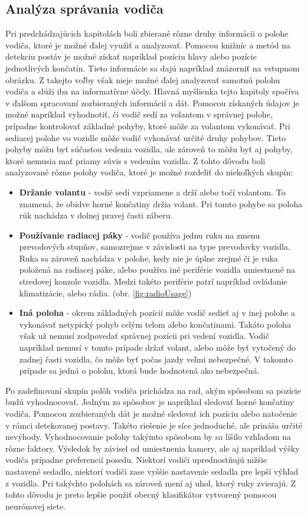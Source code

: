 \documentclass[slovak,master,dept460,male,cpp,cpdeclaration]{diploma}
\begin{document}
\newpage
\subsection{Analýza správania vodiča}
\label{sec:neuralNetwork}
Pri predchádzajúcich kapitolách boli zbierané rôzne druhy informácii o polohe vodiča, ktoré je možné ďalej využiť  a analyzovať. Pomocou   knižníc  a metód na detekciu postáv  je možné získať napríklad  pozíciu hlavy alebo pozície jednotlivých končatín.  Tieto informácie sa dajú napríklad znázorniť na vstupnom obrázku. Z takejto voľby však  nieje možné ďalej analyzovať samotnú polohu vodiča a slúži iba na informatívne účely. Hlavná myšlienka tejto kapitoly spočíva v ďalšom spracovaní zozbieraných informácií a dát. Pomocou získaných údajov je možné napríklad vyhodnotiť, či vodič sedí za volantom v správnej polohe, prípadne kontrolovať základné pohyby, ktoré môže za volantom vykonávať. Pri sediacej polohe vo vozidle môže vodič vykonávať určité druhy pohybov. Tieto pohyby môžu byť súčasťou vedenia vozidla, ale zároveň to môžu byť aj pohyby, ktoré nemusia  mať priamy súvis s vedením vozidla. Z tohto dôvodu boli analyzované rôzne polohy vodiča, ktoré je možné rozdeliť do niekoľkých skupín:
\begin{itemize}
\item \textbf{Držanie volantu} - vodič sedí vzpriamene a drží alebo točí volantom. To znamená, že obidve horné končatiny držia volant. Pri tomto pohybe sa poloha rúk nachádza v dolnej pravej časti záberu.
\item\textbf{Používanie radiacej páky} - vodič používa jednu ruku na zmenu prevodových stupňov, samozrejme v závislosti na type prevodovky vozidla. Ruka sa zároveň nachádza v polohe, kedy nie je  úplne zrejmé či je ruka položená na radiacej páke, alebo používa iné periférie vozidla umiestnené na stredovej konzole vozidla. Medzi takéto periférie patrí napríklad ovládanie klimatizácie, alebo rádia. (obr. \ref{fig:radioUsage})
\item\textbf{Iná poloha} - okrem základných pozícii môže vodič sedieť aj v inej polohe a vykonávať netypický pohyb celým telom alebo končatinami. Takáto poloha však už nemusí zodpovedať správnej pozícii  pri vedení vozidla. Vodič napríklad nemusí v tomto prípade držať volant, alebo môže byť vytočený do zadnej časti vozidla, čo môže byť počas jazdy veľmi nebezpečné. V takomto prípade sa jedná o polohu, ktorá bude hodnotená ako nebezpečná.
\end{itemize}
Po zadefinovaní skupín polôh vodiča prichádza na rad, akým spôsobom sa pozície budú vyhodnocovať. Jedným zo spôsobov je  napríklad  sledovať horné končatiny vodiča. Pomocou zozbieraných dát je možné sledovať ich pozíciu alebo natočenie v rámci detekovanej postavy. Takéto riešenie  je síce jednoduché, ale prináša  určité nevýhody. Vyhodnocovanie  polohy takýmto spôsobom by sa líšilo vzhľadom na rôzne faktory. Výsledok by závisel od umiestnenia kamery, ale aj napríklad výšky vodiča prípadne preferencií posedu. Niektorí vodiči uprednostňujú nižšie nastavené sedadlo, niektorí vodiči zase vyššie nastavenie sedadla pre lepší výhľad z vozidla. Pri takýchto polohách sa zároveň mení aj uhol, ktorý ruky zvierajú. Z tohto dôvodu je preto lepšie použiť obecný klasifikátor vytvorený pomocou neurónovej siete.  
\end{document}
